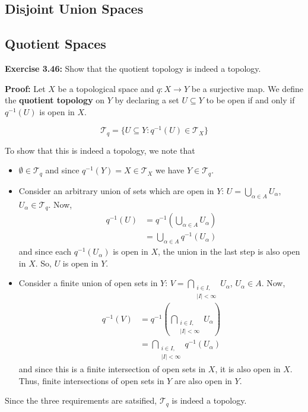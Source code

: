 \documentclass{article}
\newcommand*{\T}{\mathcal T}
\begin{document}
\subsection{Disjoint Union Spaces}

\subsection{Quotient Spaces}

\textbf{Exercise 3.46:} Show that the quotient topology is indeed a topology.

\vskip 0.5cm

\textbf{Proof:} Let $X$ be a topological space and $q : X \rightarrow Y$ be a surjective map. We define the \textbf{quotient topology} on $Y$ by declaring a set $U \subseteq Y$ to be open if and only if $q^{-1}(U)$ is open in $X$.

\[ \T_q = \{ U \subseteq Y : q^{-1}(U) \in \T_X \} \]

\vskip 0.5cm
To show that this is indeed a topology, we note that 
\begin{itemize}
  \item $\emptyset \in \T_q$ and since $q^{-1}(Y) = X \in \T_X$ we have $Y \in \T_q$.
  
  \item Consider an arbitrary union of sets which are open in $Y$: $U = \bigcup_{\alpha \in A} U_{\alpha}$, $U_{\alpha} \in \T_q$. Now, 
  \begin{align*}
    q^{-1}(U) &= q^{-1}\left(\bigcup_{\alpha \in A} U_{\alpha}\right) \\
    &= \bigcup_{\alpha \in A} q^{-1}\left(U_{\alpha}\right)
  \end{align*}
  and since each $q^{-1}(U_{\alpha})$ is open in $X$, the union in the last step is also open in $X$. So, $U$ is open in $Y$.

  \item Consider a finite union of open sets in $Y$: $V = \bigcap_{\substack{i \in I, \\ |I| < \infty}} U_{\alpha}$, $U_{\alpha} \in A$. Now,
  \begin{align*}
    q^{-1}(V) &= q^{-1}\left( \bigcap_{\substack{i \in I, \\ |I| < \infty}} U_{\alpha} \right)\\
    &= \bigcap_{\substack{i \in I, \\ |I| < \infty}} q^{-1}(U_{\alpha})
  \end{align*}
  and since this is a finite intersection of open sets in $X$, it is also open in $X$. Thus, finite intersections of open sets in $Y$ are also open in $Y$. 
\end{itemize}
\vskip 0.5cm
Since the three requirements are satsified, $\T_q$ is indeed a topology.
\end{document}
